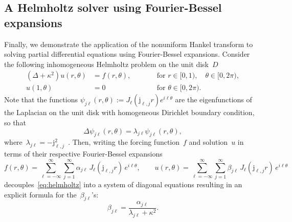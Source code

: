 \subsection{A Helmholtz solver using Fourier-Bessel expansions}

Finally, we demonstrate the application of the nonuniform Hankel transform to
solving partial differential equations using Fourier-Bessel expansions. Consider
the following inhomogeneous Helmholtz problem on the unit disk~$D$
\begin{equation}
  \label{eq:helmholtz}
    \begin{aligned}
      (\Delta + \kappa^2) u(r,\theta) &= f(r,\theta), & \qquad &\text{for } r\in
                                                                 [0,1), \quad
                                                                 \theta \in
                                                                 [0,2\pi), \\
      u(1,\theta) &= 0 & \qquad &\text{for } \theta \in [0,2\pi).
    \end{aligned}
\end{equation}
Note that the functions $\psi_{j\ell}(r,\theta) := J_\ell(\mathrm{j}_{\ell,j} r)
e^{i\ell\theta}$ are the eigenfunctions of the Laplacian on the unit disk with
homogeneous Dirichlet boundary condition, so that
\begin{equation}
  \Delta \psi_{j\ell}(r,\theta)
  = \lambda_{j\ell} \psi_{j\ell}(r,\theta),
\end{equation}
where~$\lambda_{j\ell} = -
\mathrm{j}_{\ell,j}^2$~\cite{boyd2011comparing,watson1922treatise}. Then, writing
the forcing function~$f$ and solution~$u$ in terms of their respective Fourier-Bessel
expansions
\begin{equation}
  f(r,\theta) 
  = \sum_{\ell=-\infty}^\infty \sum_{j=1}^\infty \alpha_{j\ell} \, 
  J_\ell(\mathrm{j}_{\ell,j}r) \, e^{i\ell\theta}, \qquad
  u(r,\theta) 
  = \sum_{\ell=-\infty}^\infty \sum_{j=1}^\infty \beta_{j\ell} \,
  J_\ell(\mathrm{j}_{\ell,j}r)
  \, e^{i\ell\theta}
\end{equation} 
decouples~\eqref{eq:helmholtz} into a system of diagonal equations resulting in
an explicit formula for the~$\beta_{j\ell}$'s:
\begin{equation}
  \beta_{j\ell} 
  = \frac{\alpha_{j\ell}}{\lambda_{j\ell} + \kappa^2}.
\end{equation}
